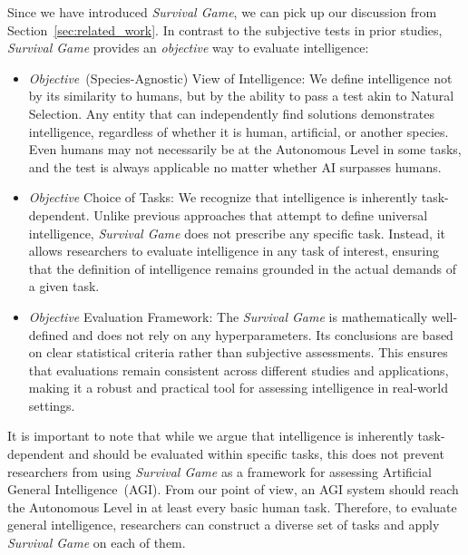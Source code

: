 Since we have introduced \textit{Survival Game}, we can pick up our discussion from Section~\ref{sec:related_work}. 
In contrast to the subjective tests in prior studies, \textit{Survival Game} provides an \textit{objective} way to evaluate intelligence:
\begin{itemize}
	\item \textit{Objective}~(Species-Agnostic) View of Intelligence: We define intelligence not by its similarity to humans, but by the ability to pass a test akin to Natural Selection. Any entity that can independently find solutions demonstrates intelligence, regardless of whether it is human, artificial, or another species. Even humans may not necessarily be at the Autonomous Level in some tasks, and the test is always applicable no matter whether AI surpasses humans.
	\item \textit{Objective} Choice of Tasks: We recognize that intelligence is inherently task-dependent. Unlike previous approaches that attempt to define universal intelligence, \textit{Survival Game} does not prescribe any specific task. Instead, it allows researchers to evaluate intelligence in any task of interest, ensuring that the definition of intelligence remains grounded in the actual demands of a given task.
	\item \textit{Objective} Evaluation Framework: The \textit{Survival Game} is mathematically well-defined and does not rely on any hyperparameters. Its conclusions are based on clear statistical criteria rather than subjective assessments. This ensures that evaluations remain consistent across different studies and applications, making it a robust and practical tool for assessing intelligence in real-world settings.
\end{itemize}

It is important to note that while we argue that intelligence is inherently task-dependent and should be evaluated within specific tasks, this does not prevent researchers from using \textit{Survival Game} as a framework for assessing Artificial General Intelligence~(AGI). 
From our point of view, an AGI system should reach the Autonomous Level in at least every basic human task. Therefore, to evaluate general intelligence, researchers can construct a diverse set of tasks and apply \textit{Survival Game} on each of them.



